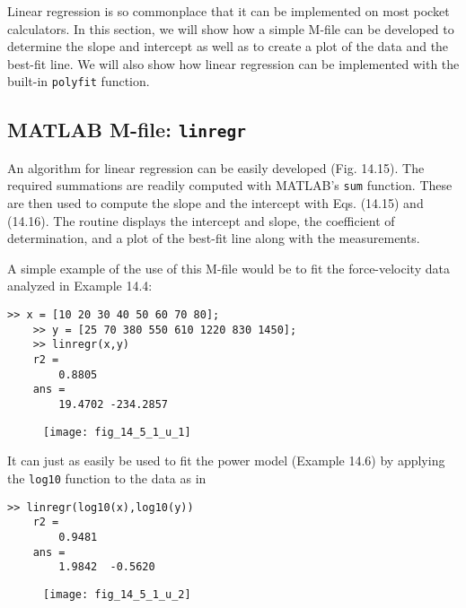 \documentclass[../main.tex]{subfiles}
\begin{document}
\noindent Linear regression is so commonplace that it can be implemented on most pocket calculators. In this section, we will show how a simple M-file can be developed to determine the slope and intercept as well as to create a plot of the data and the best-fit line. We will also show how linear regression can be implemented with the built-in \texttt{polyfit} function.

\label{cha:cha_P_14_5_1}
\subsection{MATLAB M-file: \texttt{linregr}}
\noindent An algorithm for linear regression can be easily developed (Fig. 14.15). The required summations are readily computed with MATLAB's \texttt{sum} function. These are then used to compute the slope and the intercept with Eqs. (14.15) and (14.16). The routine displays the intercept and slope, the coefficient of determination, and a plot of the best-fit line along with the measurements.

A simple example of the use of this M-file would be to fit the force-velocity data analyzed in Example 14.4:

\begin{lstlisting}[numbers=none]
	>> x = [10 20 30 40 50 60 70 80];
	>> y = [25 70 380 550 610 1220 830 1450];
	>> linregr(x,y)
	r2 =
		0.8805
	ans =
		19.4702 -234.2857
\end{lstlisting}

\begin{figure}[H]
	\centering
	\texttt{[image: fig\_14\_5\_1\_u\_1]}
\end{figure}

It can just as easily be used to fit the power model (Example 14.6) by applying the
\texttt{log10} function to the data as in

\begin{lstlisting}[numbers=none]
	>> linregr(log10(x),log10(y))
	r2 =
		0.9481
	ans =
		1.9842	-0.5620
\end{lstlisting}

\begin{figure}[H]
	\centering
	\texttt{[image: fig\_14\_5\_1\_u\_2]}
\end{figure}
\end{document}
